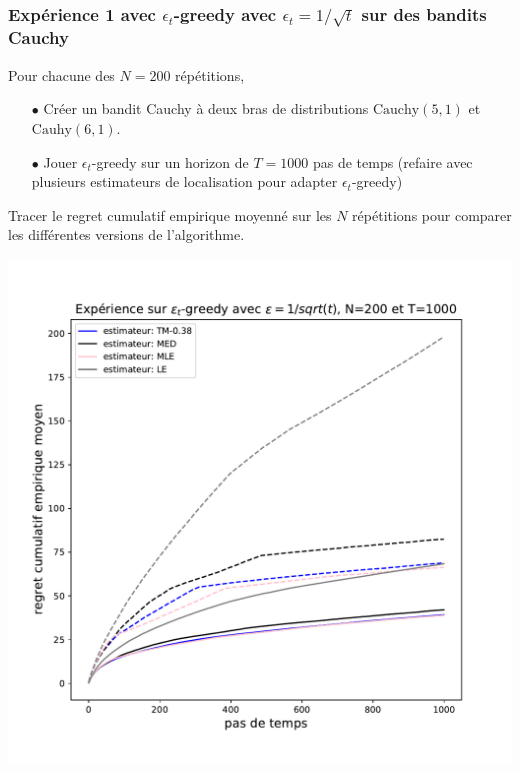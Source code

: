 \documentclass[8pt, sans]{beamer}
\begin{document}
\begin{frame}

\frametitle{Expérience 1 avec $\epsilon_t$-greedy avec $\epsilon_t=1/\sqrt{t}$ sur des bandits Cauchy}

Pour chacune des $N=200$ répétitions,\\

\pause

\begin{itemize}

\item[$\bullet$] Créer un bandit Cauchy à deux bras de distributions $\mathrm{Cauchy}(5,1)$ et $\mathrm{Cauhy}(6,1).$

\pause
\item[$\bullet$] Jouer $\epsilon_t$-greedy sur un horizon de $T=1000$ pas de temps (refaire avec plusieurs estimateurs de localisation pour adapter $\epsilon_t$-greedy)
\end{itemize}

\pause
Tracer le regret cumulatif empirique moyenné sur les $N$ répétitions pour comparer les différentes versions de l'algorithme.

\begin{center}
\includegraphics[scale=0.3]{experience-epsilon-t-greedy.pdf}
\end{center}

\end{frame}
\end{document}
